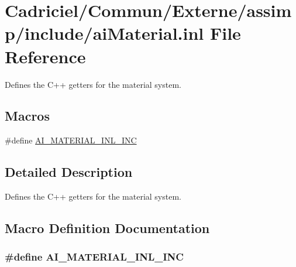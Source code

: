 \hypertarget{ai_material_8inl}{\section{Cadriciel/\-Commun/\-Externe/assimp/include/ai\-Material.inl File Reference}
\label{ai_material_8inl}
}


Defines the C++ getters for the material system.  


\subsection*{Macros}
\begin{DoxyCompactItemize}
\item 
\#define \hyperlink{ai_material_8inl_a49569a1f424aa8e1c0a0a1b991748fbc}{A\-I\-\_\-\-M\-A\-T\-E\-R\-I\-A\-L\-\_\-\-I\-N\-L\-\_\-\-I\-N\-C}
\end{DoxyCompactItemize}


\subsection{Detailed Description}
Defines the C++ getters for the material system. 

\subsection{Macro Definition Documentation}
\hypertarget{ai_material_8inl_a49569a1f424aa8e1c0a0a1b991748fbc}{
\subsubsection[{A\-I\-\_\-\-M\-A\-T\-E\-R\-I\-A\-L\-\_\-\-I\-N\-L\-\_\-\-I\-N\-C}]{\setlength{\rightskip}{0pt plus 5cm}\#define A\-I\-\_\-\-M\-A\-T\-E\-R\-I\-A\-L\-\_\-\-I\-N\-L\-\_\-\-I\-N\-C}}\label{ai_material_8inl_a49569a1f424aa8e1c0a0a1b991748fbc}
